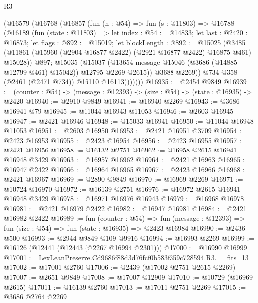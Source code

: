 \begin{lexlean}{R3}
\begin{coremodule}
            (@16579
              (@16768
                (@16857
                  (fun (n : @54) =>
                  fun (s : @11803) =>
                  @16788
                    (@16189
                      (fun (state : @11803) =>
                      let index : @54 := @14833;
                      let last : @2420 := @16873;
                      let flags : @892 := @15019;
                      let blockLength : @892 := @15025
                        (@3485
                          (@11861
                            (@15960 (@2904 @16877 @2422) (@2921 @16877 @2422) @16875 @461)
                            @15028))
                        @897;
                      @15035
                        (@15037
                          (@13654 message @15046 (@3686 (@14885 @12799 @461) @15042))
                          @12795
                          @2269
                          @2615))
                      @3688
                      @2269))
                  @734
                  @358
                  (@2461 (@2471 @734))
                  @16110
                  @16113)))))))
@16935 := @2454 @9849
@16939 := (counter : @54) -> (message : @12393) -> (size : @54) -> (state : @16935) -> @2420
@16940 := @2910 @9849
@16941 := @16940 @2269
@16943 := @3686 @16941 @79
@16945 := @11044 @16943 @11053
@16946 := @2603 @16945
@16947 := @2421 @16946
@16948 := @15033 @16941
@16950 := @11044 @16948 @11053
@16951 := @2603 @16950
@16953 := @2421 @16951 @3709
@16954 := @2423 @16953
@16955 := @2423 @16954
@16956 := @2423 @16955
@16957 := @2421 @16956
@16958 := @16132 @2751
@16962 := @16958 @2615 @16941 @16948 @3429
@16963 := @16957 @16962
@16964 := @2421 @16963
@16965 := @16947 @2422
@16966 := @16964 @16965
@16967 := @2423 @16966
@16968 := @2421 @16967
@16969 := @2890 @9849
@16970 := @16969 @2269
@16971 := @10724 @16970
@16972 := @16139 @2751
@16976 := @16972 @2615 @16941 @16948 @3429
@16978 := @16971 @16976 @16943
@16979 := @16968 @16978
@16981 := @2421 @16979 @2422
@16982 := @16947 @16981
@16984 := @2421 @16982 @2422
@16989 := fun (counter : @54) =>
  fun (message : @12393) => fun (size : @54) => fun (state : @16935) => @2423 @16984
@16990 := @2436 @500
@16993 := @2944 @9849 @109 @9916
@16994 := @16993 @2269
@16999 := @16126 (@12441 (@12443 (@2267 @16994 @2301)))
@17000 := @16990 @16999
@17001 := LexLeanPreserve.Cd9686f88d3d76fcf0b583f359c728594.R3.__fits_13
@17002 := @17001 @2760
@17006 := @2439 (@17002 @2751 @2615 @2269)
@17007 := @2651 @9849
@17008 := @17007 @12909
@17010 := @10729 (@16969 @2615)
@17011 := @16139 @2760
@17013 := @17011 @2751 @2269
@17015 := @3686 @2764 @2269

\end{coremodule}
\end{lexlean}
